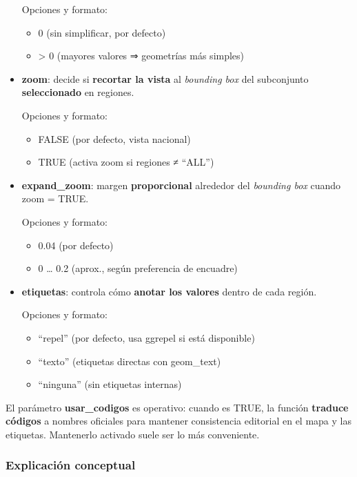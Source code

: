 \documentclass[
  11pt,
  letterpaper,
  DIV=11,
  numbers=noendperiod]{scrartcl}
\begin{document}
\begin{itemize}
  Opciones y formato:

  \begin{itemize}
  \item
    0 (sin simplificar, por defecto)
  \item
    \textgreater{} 0 (mayores valores ⇒ geometrías más simples)
  \end{itemize}
\item
  \textbf{zoom}: decide si \textbf{recortar la vista} al \emph{bounding
  box} del subconjunto \textbf{seleccionado} en regiones.

  Opciones y formato:

  \begin{itemize}
  \item
    FALSE (por defecto, vista nacional)
  \item
    TRUE (activa zoom si regiones ≠ ``ALL'')
  \end{itemize}
\item
  \textbf{expand\_zoom}: margen \textbf{proporcional} alrededor del
  \emph{bounding box} cuando zoom = TRUE.

  Opciones y formato:

  \begin{itemize}
  \item
    0.04 (por defecto)
  \item
    0 \ldots{} 0.2 (aprox., según preferencia de encuadre)
  \end{itemize}
\item
  \textbf{etiquetas}: controla cómo \textbf{anotar los valores} dentro
  de cada región.

  Opciones y formato:

  \begin{itemize}
  \item
    ``repel'' (por defecto, usa ggrepel si está disponible)
  \item
    ``texto'' (etiquetas directas con geom\_text)
  \item
    ``ninguna'' (sin etiquetas internas)
  \end{itemize}
\end{itemize}

El parámetro \textbf{usar\_codigos} es operativo: cuando es TRUE, la
función \textbf{traduce códigos} a nombres oficiales para mantener
consistencia editorial en el mapa y las etiquetas. Mantenerlo activado
suele ser lo más conveniente.

\subsubsection{\texorpdfstring{\textbf{Explicación
conceptual}}{Explicación conceptual}}\label{explicaciuxf3n-conceptual-6}
\end{document}

